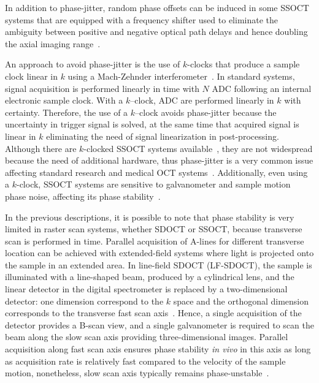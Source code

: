In addition to phase-jitter, random phase offsets can be induced in some SSOCT systems that are equipped with a frequency shifter used to eliminate the ambiguity between positive and negative optical path delays and hence doubling the axial imaging range~\cite{Yun2004_Removing}.

An approach to avoid phase-jitter is the use of $k$-clocks that produce a sample clock linear in $k$ using a Mach-Zehnder interferometer~\cite{Johnson2016_Multispeed}. In standard systems, signal acquisition is performed linearly in time with $N$ ADC following an internal electronic sample clock. With a $k$--clock, ADC are performed linearly in $k$ with certainty. Therefore, the use of a $k$--clock avoids phase-jitter because the uncertainty in trigger signal is solved, at the same time that acquired signal is linear in $k$ eliminating the need of signal linearization in post-processing. Although there are $k$-clocked SSOCT systems available~\cite{Kumar2017_Invivo}, they are not widespread because the need of additional hardware, thus phase-jitter is a very common issue affecting standard research and medical OCT systems~\cite{Bouma2015_Optical}. Additionally, even using a $k$-clock, SSOCT systems are sensitive to galvanometer and sample motion phase noise, affecting its phase stability~\cite{Shemonski2014_Stability-1}.

In the previous descriptions, it is possible to note that phase stability is very limited in raster scan systems, whether SDOCT or SSOCT, because transverse scan is performed in time. Parallel acquisition of A-lines for different transverse location can be achieved with extended-field systems where light is projected onto the sample in an extended area. In line-field SDOCT (LF-SDOCT), the sample is illuminated with a line-shaped beam, produced by a cylindrical lens, and the linear detector in the digital spectrometer is replaced by a two-dimensional detector: one dimension correspond to the $k$ space and the orthogonal dimension corresponds to the transverse fast scan axis~\cite{Nakamura2007_Highspeed, Ginner2017_Noniterative}. Hence, a single acquisition of the detector provides a B-scan view, and a single galvanometer is required to scan the beam along the slow scan axis providing three-dimensional images. Parallel acquisition along fast scan axis ensures phase stability \textit{in vivo} in this axis as long as acquisition rate is relatively fast compared to the velocity of the sample motion, nonetheless, slow scan axis typically remains phase-unstable~\cite{Ginner2017_Noniterative}.

